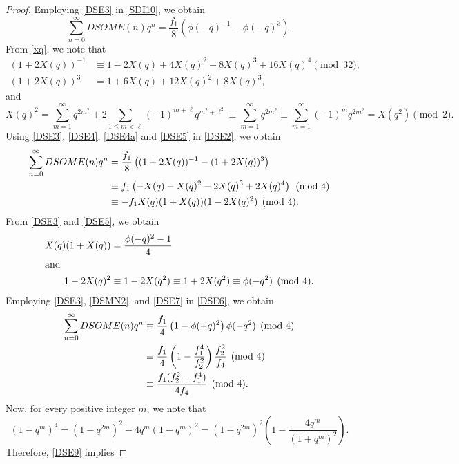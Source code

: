 \documentclass[12pt]{article}
\numberwithin{equation}{section}
\theoremstyle{definition}
\theoremstyle{remark}
\numberwithin{equation}{section}
\begin{document}
\begin{proof}
Employing \eqref{DSE3} in \eqref{SDI10},  we obtain
\begin{equation}\label{DSE2}
\sum_{n=0}^{\infty}DSOME(n)q^n
=
\dfrac{f_1}{8}
\left(
\phi(-q)^{-1}-\phi(-q)^3
\right).
\end{equation}
From \eqref{xq}, we note that
\begin{align}
\label{DSE4}(1+2X(q))^{-1}
&\equiv
1-2X(q)+4X(q)^2-8X(q)^3+16X(q)^4
\pmod{32},
\\
\label{DSE4a}(1+2X(q))^3
&=
1+6X(q)+12X(q)^2+8X(q)^3,
\end{align}
 and
\begin{equation}\label{DSE5}
X(q)^2=
\sum_{m=1}^{\infty}q^{2m^2}
+
2\sum_{1\leq m<\ell}
(-1)^{m+\ell}q^{m^2+\ell^2}
\equiv
\sum_{m=1}^{\infty}q^{2m^2}
\equiv
\sum_{m=1}^{\infty}(-1)^m q^{2m^2}
=X(q^2)
\pmod2.
\end{equation}
Using  \eqref{DSE3}, \eqref{DSE4}, \eqref{DSE4a} and \eqref{DSE5} in \eqref{DSE2}, we obtain
\begin{align}
\sum_{n=0}^{\infty}DSOME(n)q^n
&\label{DSMN1}=
\dfrac{f_1}{8}
\left(
(1+2X(q))^{-1}-(1+2X(q))^3
\right)\\
&\equiv
f_1\left(-X(q)-X(q)^2-2X(q)^3+2X(q)^4\right)
\pmod4
\notag\\
&\label{DSE6}\equiv
-f_1X(q)(1+X(q))(1-2X(q)^2)
\pmod4.
\end{align}
From \eqref{DSE3} and \eqref{DSE5}, we obtain
\begin{align}
X(q)(1+X(q))
&\label{DSMN2}=
\dfrac{\phi(-q)^2-1}{4}\\\intertext{and}
1-2X(q)^2
&\label{DSE7}\equiv
1-2X(q^2)
\equiv
1+2X(q^2)
\equiv
\phi(-q^2)
\pmod4.
\end{align}
Employing \eqref{DSE3}, \eqref{DSMN2}, and \eqref{DSE7} in \eqref{DSE6}, we obtain
\begin{align}
\sum_{n=0}^{\infty}DSOME(n)q^n
&\equiv
\dfrac{f_1}{4}
\left(1-\phi(-q)^2\right)
\phi(-q^2)
\pmod4
\notag\\
&\equiv
\dfrac{f_1}{4}
\left(
1-\dfrac{f_1^4}{f_2^2}
\right)
\dfrac{f_2^2}{f_4}\pmod4
\notag\\
&\label{DSE8}\equiv
\dfrac{f_1(f_2^2-f_1^4)}{4f_4}
\pmod4.
\end{align}
Now, for every positive integer $m$, we note that
\begin{equation}\label{DSE9}
(1-q^m)^4=
(1-q^{2m})^2-4q^m(1-q^m)^2
=
(1-q^{2m})^2
\left(
1-\dfrac{4q^m}{(1+q^m)^2}
\right).
\end{equation}
Therefore, \eqref{DSE9} implies

\end{proof}
\end{document}
